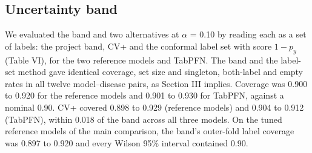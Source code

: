 \documentclass[conference]{IEEEtran}
\begin{document}
\begin{table}[!t]
\caption{Balanced accuracy by decision rule, logistic regression / gradient boosting / TabPFN, mean over outer folds (15 for the reference models, 5 for TabPFN).}
\label{tab:threshold}
\centering\footnotesize
{}
\end{table}

\subsection{Uncertainty band}

We evaluated the band and two alternatives at $\alpha$ = 0.10 by reading each as a set of labels: the project band, CV+ \cite{barber2021} and the conformal label set with score $1-p_y$ (Table VI), for the two reference models and TabPFN. The band and the label-set method gave identical coverage, set size and singleton, both-label and empty rates in all twelve model--disease pairs, as Section III implies. Coverage was 0.900 to 0.920 for the reference models and 0.901 to 0.930 for TabPFN, against a nominal 0.90. CV+ covered 0.898 to 0.929 (reference models) and 0.904 to 0.912 (TabPFN), within 0.018 of the band across all three models. On the tuned reference models of the main comparison, the band's outer-fold label coverage was 0.897 to 0.920 and every Wilson 95\% interval contained 0.90.

\begin{table}[!t]
\caption{Label coverage (nominal 0.90) and share of singleton label sets, logistic regression / gradient boosting / TabPFN. The band and the label-set method are identical.}
\label{tab:band}
\centering\footnotesize
{}
\end{table}
\end{document}
